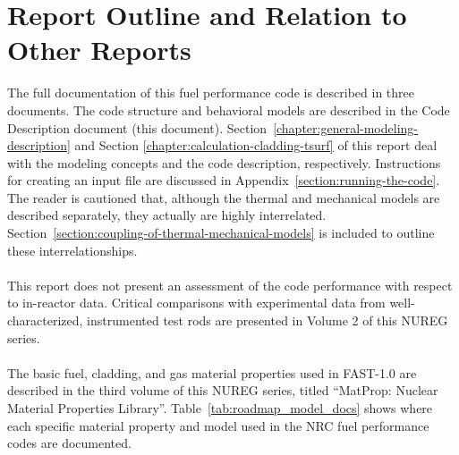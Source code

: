 \section{Report Outline and Relation to Other Reports} \label{section:outline}

The full documentation of this fuel performance code is described in three documents. The code
structure and behavioral models are described in the Code Description document (this document).
Section~\ref{chapter:general-modeling-description} and Section
\ref{chapter:calculation-cladding-tsurf} of this report deal with the modeling concepts and the code
description, respectively. Instructions for creating an input file are discussed in
Appendix~\ref{section:running-the-code}. The reader is cautioned that, although the thermal and
mechanical models are described separately, they actually are highly interrelated.
Section~\ref{section:coupling-of-thermal-mechanical-models} is included to outline these
interrelationships.
\\
\\
This report does not present an assessment of the code performance with respect to in-reactor data.
Critical comparisons with experimental data from well-characterized, instrumented test rods are
presented in Volume 2 of this NUREG series.
\\
\\
The basic fuel, cladding, and gas material properties used in FAST-1.0 are described in the third
volume of this NUREG series, titled ``MatProp: Nuclear Material Properties Library''.
Table~\ref{tab:roadmap_model_docs} shows where each specific material property and model used in the
NRC fuel performance codes are documented.
\renewcommand{\captiontext}{Roadmap to Documentation of models and properties in FAST-1.0}
